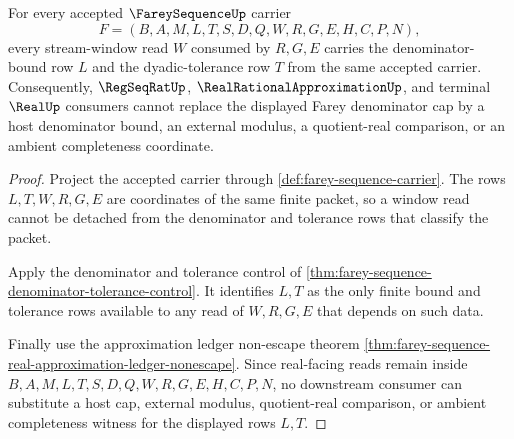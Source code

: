 \begin{theorem}
\label{thm:farey-sequence-stream-window-denominator-lock}
For every accepted $\FareySequenceUp$ carrier
$$
F=(B,A,M,L,T,S,D,Q,W,R,G,E,H,C,P,N),
$$
every stream-window read $W$ consumed by $R,G,E$ carries the denominator-bound row $L$ and the dyadic-tolerance row $T$ from the same accepted carrier. Consequently, $\RegSeqRatUp$, $\RealRationalApproximationUp$, and terminal $\RealUp$ consumers cannot replace the displayed Farey denominator cap by a host denominator bound, an external modulus, a quotient-real comparison, or an ambient completeness coordinate.
\end{theorem}
\begin{proof}
Project the accepted carrier through \autoref{def:farey-sequence-carrier}. The rows $L,T,W,R,G,E$ are coordinates of the same finite packet, so a window read cannot be detached from the denominator and tolerance rows that classify the packet.

Apply the denominator and tolerance control of \autoref{thm:farey-sequence-denominator-tolerance-control}. It identifies $L,T$ as the only finite bound and tolerance rows available to any read of $W,R,G,E$ that depends on such data.

Finally use the approximation ledger non-escape theorem \autoref{thm:farey-sequence-real-approximation-ledger-nonescape}. Since real-facing reads remain inside $B,A,M,L,T,S,D,Q,W,R,G,E,H,C,P,N$, no downstream consumer can substitute a host cap, external modulus, quotient-real comparison, or ambient completeness witness for the displayed rows $L,T$.
\end{proof}

